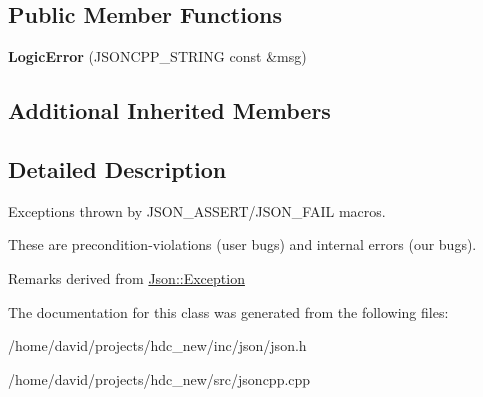 \subsection*{Public Member Functions}
\begin{DoxyCompactItemize}
\item 
{\bfseries Logic\+Error} (J\+S\+O\+N\+C\+P\+P\+\_\+\+S\+T\+R\+I\+NG const \&msg)\hypertarget{class_json_1_1_logic_error_acca679aa49768a4a1de7b705c67c2919}{}\label{class_json_1_1_logic_error_acca679aa49768a4a1de7b705c67c2919}

\end{DoxyCompactItemize}
\subsection*{Additional Inherited Members}


\subsection{Detailed Description}
Exceptions thrown by J\+S\+O\+N\+\_\+\+A\+S\+S\+E\+R\+T/\+J\+S\+O\+N\+\_\+\+F\+A\+IL macros.

These are precondition-\/violations (user bugs) and internal errors (our bugs).

\begin{DoxyRemark}{Remarks}
derived from \hyperlink{class_json_1_1_exception}{Json\+::\+Exception} 
\end{DoxyRemark}


The documentation for this class was generated from the following files\+:\begin{DoxyCompactItemize}
\item 
/home/david/projects/hdc\+\_\+new/inc/json/json.\+h\item 
/home/david/projects/hdc\+\_\+new/src/jsoncpp.\+cpp\end{DoxyCompactItemize}
